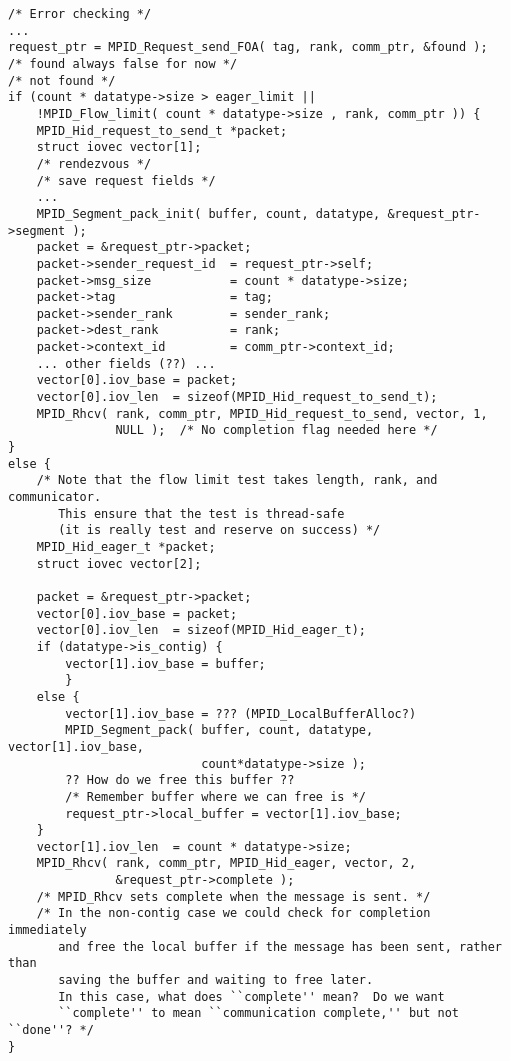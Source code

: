 \begin{verbatim}
/* Error checking */
...
request_ptr = MPID_Request_send_FOA( tag, rank, comm_ptr, &found );
/* found always false for now */
/* not found */
if (count * datatype->size > eager_limit ||
    !MPID_Flow_limit( count * datatype->size , rank, comm_ptr )) {
    MPID_Hid_request_to_send_t *packet;
    struct iovec vector[1];
    /* rendezvous */
    /* save request fields */
    ...
    MPID_Segment_pack_init( buffer, count, datatype, &request_ptr->segment );
    packet = &request_ptr->packet;
    packet->sender_request_id  = request_ptr->self;
    packet->msg_size           = count * datatype->size;
    packet->tag                = tag;
    packet->sender_rank        = sender_rank;
    packet->dest_rank          = rank;
    packet->context_id         = comm_ptr->context_id;
    ... other fields (??) ...
    vector[0].iov_base = packet;
    vector[0].iov_len  = sizeof(MPID_Hid_request_to_send_t);
    MPID_Rhcv( rank, comm_ptr, MPID_Hid_request_to_send, vector, 1, 
               NULL );  /* No completion flag needed here */
}
else {
    /* Note that the flow limit test takes length, rank, and communicator.
       This ensure that the test is thread-safe 
       (it is really test and reserve on success) */
    MPID_Hid_eager_t *packet;
    struct iovec vector[2];

    packet = &request_ptr->packet; 
    vector[0].iov_base = packet;
    vector[0].iov_len  = sizeof(MPID_Hid_eager_t);
    if (datatype->is_contig) {
        vector[1].iov_base = buffer;
        }
    else {
        vector[1].iov_base = ??? (MPID_LocalBufferAlloc?)
        MPID_Segment_pack( buffer, count, datatype, vector[1].iov_base, 
                           count*datatype->size );
        ?? How do we free this buffer ??
        /* Remember buffer where we can free is */
        request_ptr->local_buffer = vector[1].iov_base;
    }
    vector[1].iov_len  = count * datatype->size;
    MPID_Rhcv( rank, comm_ptr, MPID_Hid_eager, vector, 2, 
               &request_ptr->complete );
    /* MPID_Rhcv sets complete when the message is sent. */
    /* In the non-contig case we could check for completion immediately
       and free the local buffer if the message has been sent, rather than 
       saving the buffer and waiting to free later.
       In this case, what does ``complete'' mean?  Do we want
       ``complete'' to mean ``communication complete,'' but not ``done''? */
}
\end{verbatim}

